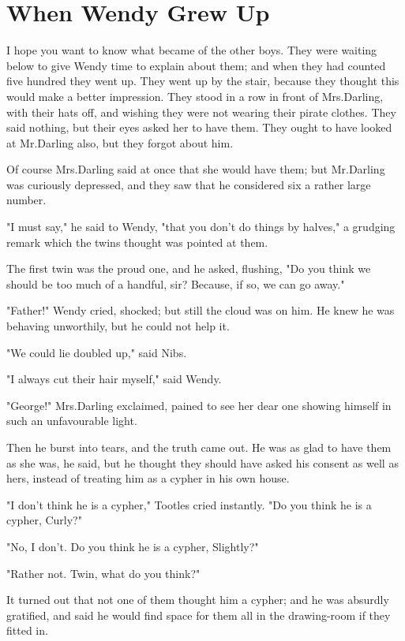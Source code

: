 
\chapter{When Wendy Grew Up}

I hope you want to know what became of the other boys.
They were waiting below to give Wendy time to explain about them;
and when they had counted five hundred they went up.
They went up by the stair,
because they thought this would make a better impression.
They stood in a row in front of Mrs.\@ Darling, with their hats off,
and wishing they were not wearing their pirate clothes.
They said nothing, but their eyes asked her to have them.
They ought to have looked at Mr.\@ Darling also, but they forgot about him.

Of course Mrs.\@ Darling said at once that she would have them;
but Mr.\@ Darling was curiously depressed,
and they saw that he considered six a rather large number.

"I must say," he said to Wendy, "that you don't do things by halves,"
a grudging remark which the twins thought was pointed at them.

The first twin was the proud one, and he asked, flushing,
"Do you think we should be too much of a handful, sir?
Because, if so, we can go away."

"Father!\@" Wendy cried, shocked;
but still the cloud was on him.
He knew he was behaving unworthily, but he could not help it.

"We could lie doubled up," said Nibs.

"I always cut their hair myself," said Wendy.

"George!\@" Mrs.\@ Darling exclaimed,
pained to see her dear one showing himself in such an unfavourable light.

Then he burst into tears, and the truth came out.
He was as glad to have them as she was, he said,
but he thought they should have asked his consent as well as hers, instead of treating him as a cypher in his own house.

"I don't think he is a cypher," Tootles cried instantly.
"Do you think he is a cypher, Curly?"

"No, I don't.
Do you think he is a cypher, Slightly?"

"Rather not.
Twin, what do you think?"

It turned out that not one of them thought him a cypher;
and he was absurdly gratified,
and said he would find space for them all in the drawing-room if they fitted in.

